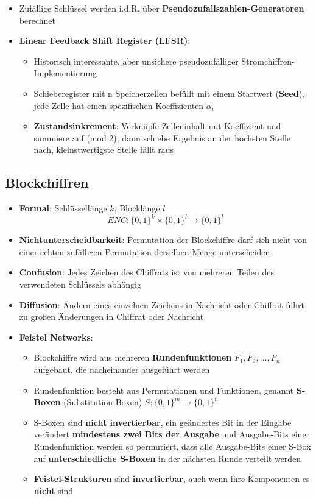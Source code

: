 \begin{itemize}
	\item Zufällige Schlüssel werden i.d.R. über \textbf{Pseudozufallszahlen-Generatoren} berechnet
	\item \textbf{Linear Feedback Shift Register (LFSR)}:
	\begin{itemize}
		\item Historisch interessante, aber unsichere pseudozufälliger Stromchiffren-Implementierung
		\item Schieberegister mit n Speicherzellen befüllt mit einem Startwert (\textbf{Seed}), jede Zelle hat einen spezifischen Koeffizienten $\alpha_i$
		\item \textbf{Zustandsinkrement}: Verknüpfe Zelleninhalt mit Koeffizient und summiere auf (mod 2), dann schiebe Ergebnis an der höchsten Stelle nach, kleinstwertigste Stelle fällt raus
	\end{itemize}
\end{itemize}

\subsection{Blockchiffren}%
\label{symver:sub:blockchiffren}

\begin{itemize}
	\item \textbf{Formal}: Schlüssellänge $k$, Blocklänge $l$
	$$
		ENC: \{0, 1\}^k \times \{0, 1\}^l \rightarrow \{0, 1\}^l
	$$
	\item \textbf{Nichtunterscheidbarkeit}: Permutation der Blockchiffre darf sich nicht von einer echten zufälligen Permutation derselben Menge unterscheiden
	\item \textbf{Confusion}: Jedes Zeichen des Chiffrats ist von mehreren Teilen des verwendeten Schlüssels abhängig
	\item \textbf{Diffusion}: Ändern eines einzelnen Zeichens in Nachricht oder Chiffrat führt zu großen Änderungen in Chiffrat oder Nachricht
	\item \textbf{Feistel Networks}:
	\begin{itemize}
		\item Blockchiffre wird aus mehreren \textbf{Rundenfunktionen} $F_1, F_2, \dots, F_n$ aufgebaut, die nacheinander ausgeführt werden
		\item Rundenfunktion besteht aus Permutationen und Funktionen, genannt \textbf{S-Boxen} (Substitution-Boxen) $S: \{0, 1\}^m \rightarrow \{0, 1\}^n$
		\item S-Boxen sind \textbf{nicht invertierbar}, ein geändertes Bit in der Eingabe verändert \textbf{mindestens zwei Bits der Ausgabe} und Ausgabe-Bits einer Rundenfunktion werden so permutiert, dass alle Ausgabe-Bits einer S-Box auf \textbf{unterschiedliche S-Boxen} in der nächsten Runde verteilt werden
		\item \textbf{Feistel-Strukturen} sind \textbf{invertierbar}, auch wenn ihre Komponenten es \textbf{nicht} sind
	\end{itemize}
\end{itemize}

